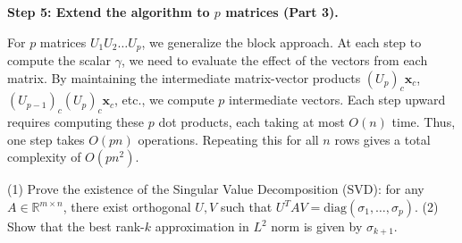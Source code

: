 \begin{solution}
\textbf{Step 5: Extend the algorithm to $p$ matrices (Part 3).}

For $p$ matrices $U_1 U_2 \dots U_p$, we generalize the block approach. At each step to compute the scalar $\gamma$, we need to evaluate the effect of the vectors from each matrix. By maintaining the intermediate matrix-vector products $(U_p)_c \mathbf{x}_c$, $(U_{p-1})_c (U_p)_c \mathbf{x}_c$, etc., we compute $p$ intermediate vectors.
Each step upward requires computing these $p$ dot products, each taking at most $O(n)$ time. Thus, one step takes $O(pn)$ operations.
Repeating this for all $n$ rows gives a total complexity of $O(p n^2)$.
\end{solution}

\begin{exercise}\label{probability:2010:6}
(1) Prove the existence of the Singular Value Decomposition (SVD): for any $A \in \mathbb{R}^{m \times n}$, there exist orthogonal $U, V$ such that $U^T A V = \text{diag}(\sigma_1, \dots, \sigma_p)$.
(2) Show that the best rank-$k$ approximation in $L^2$ norm is given by $\sigma_{k+1}$.
\end{exercise}

